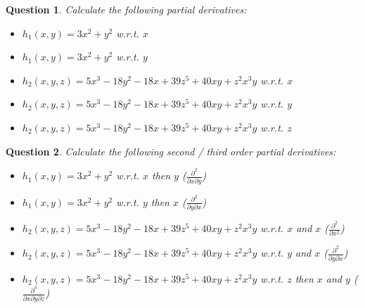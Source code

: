 \documentclass[]{article}
\newtheorem{question}{Question}
\begin{document}
	\begin{question}
		Calculate the following partial derivatives:\\
		\begin{itemize}
			\item $h_1(x,y) = 3x^2+y^2$ w.r.t. $x$
			\item $h_1(x,y) = 3x^2+y^2$ w.r.t. $y$
			\item $h_2(x,y,z) = 5x^3-18y^2-18x+39z^5+40xy+z^2x^3y$ w.r.t. $x$
			\item $h_2(x,y,z) = 5x^3-18y^2-18x+39z^5+40xy+z^2x^3y$ w.r.t. $y$
			\item $h_2(x,y,z) = 5x^3-18y^2-18x+39z^5+40xy+z^2x^3y$ w.r.t. $z$
		\end{itemize}
	\end{question}
	
	\begin{question}
		Calculate the following second / third order partial derivatives:\\
		\begin{itemize}
			\item $h_1(x,y) = 3x^2+y^2$ w.r.t. $x$ then $y$ ($\frac{\partial^2}{\partial x \partial y}$)
			\item $h_1(x,y) = 3x^2+y^2$ w.r.t. $y$ then $x$ ($\frac{\partial^2}{\partial y \partial x}$)
			\item $h_2(x,y,z) = 5x^3-18y^2-18x+39z^5+40xy+z^2x^3y$ w.r.t. $x$ and $x$ ($\frac{\partial^2}{\partial x^2}$)
			\item $h_2(x,y,z) = 5x^3-18y^2-18x+39z^5+40xy+z^2x^3y$ w.r.t. $y$ and $x$ ($\frac{\partial^2}{\partial y \partial x}$)
			\item $h_2(x,y,z) = 5x^3-18y^2-18x+39z^5+40xy+z^2x^3y$ w.r.t. $z$ then $x$ and $y$ ($\frac{\partial^3}{\partial x \partial y \partial z}$)
		\end{itemize}
	\end{question}
	
	
\end{document}
